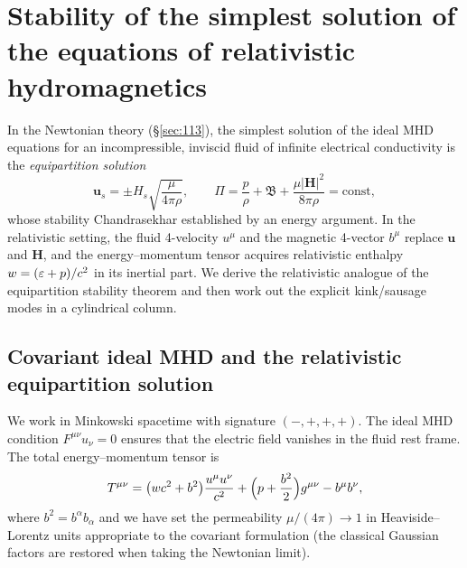 %

\section{Stability of the simplest solution of the equations of
relativistic hydromagnetics}
\label{sec:rel-113}

In the Newtonian theory (\S\ref{sec:113}), the simplest solution of
the ideal MHD equations for an incompressible, inviscid fluid of
infinite electrical conductivity is the \emph{equipartition solution}
\begin{equation}
\label{eq:rel-12-215}
\mathbf{u}_{s} = \pm H_{s}\sqrt{\frac{\mu}{4\pi\rho}},
\qquad
\Pi = \frac{p}{\rho} + \mathfrak{B}
  + \frac{\mu|\mathbf{H}|^{2}}{8\pi\rho} = \text{const},
\end{equation}
whose stability Chandrasekhar established by an energy argument.  In
the relativistic setting, the fluid 4-velocity $u^{\mu}$ and the
magnetic 4-vector $b^{\mu}$ replace $\mathbf{u}$ and $\mathbf{H}$,
and the energy--momentum tensor acquires relativistic enthalpy
$w = (\varepsilon + p)/c^{2}$ in its inertial part.  We derive
the relativistic analogue of the equipartition stability theorem and
then work out the explicit kink/sausage modes in a cylindrical column.

\subsection{Covariant ideal MHD and the relativistic equipartition
solution}
\label{sec:rel-113-cov}

We work in Minkowski spacetime with signature $(-,+,+,+)$.  The ideal
MHD condition $F^{\mu\nu}u_{\nu} = 0$ ensures that the electric field
vanishes in the fluid rest frame.  The total energy--momentum tensor is
\begin{equation}
\label{eq:rel-113-Tmunu}
T^{\mu\nu} = \bigl(w c^{2} + b^{2}\bigr)
  \frac{u^{\mu}u^{\nu}}{c^{2}}
  + \Bigl(p + \frac{b^{2}}{2}\Bigr)g^{\mu\nu}
  - b^{\mu}b^{\nu},
\end{equation}
where $b^{2} = b^{\alpha}b_{\alpha}$ and we have set the permeability
$\mu/(4\pi) \to 1$ in Heaviside--Lorentz units appropriate to the
covariant formulation (the classical Gaussian factors are restored
when taking the Newtonian limit).

